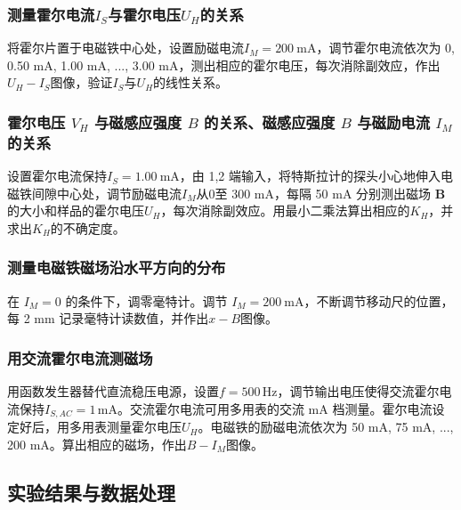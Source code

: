 \documentclass[UTF8]{article}
\theoremstyle{MyLineTheoremStyle} %
\theoremstyle{MyBlockTheoremStyle} %
\theoremstyle{MySubsubsectionStyle} %
\begin{document}
\subsubsection{测量霍尔电流$ I_S $与霍尔电压$ U_H $的关系}

将霍尔片置于电磁铁中心处，设置励磁电流$ I_M= 200 \ \mathrm{mA}$，调节霍尔电流依次为 0, 0.50 mA, 1.00 mA, ..., 3.00 mA，测出相应的霍尔电压，每次消除副效应，作出$ U_H-I_S $图像，验证$ I_S $与$ U_H $的线性关系。

\subsubsection{霍尔电压 $V_H$ 与磁感应强度 $B$ 的关系、磁感应强度 $B$ 与磁励电流 $I_M$ 的关系}

设置霍尔电流保持$ I_S = 1.00 \ \mathrm{mA}$，由 1,2 端输入，将特斯拉计的探头小心地伸入电磁铁间隙中心处，调节励磁电流$ I_M $从$ 0 $至 300 mA，每隔 50 mA 分别测出磁场 $\boldsymbol{B}$ 的大小和样品的霍尔电压$ U_H $，每次消除副效应。用最小二乘法算出相应的$ K_H $，并求出$ K_H $的不确定度。

\subsubsection{测量电磁铁磁场沿水平方向的分布}
在 $I_M = 0$ 的条件下，调零毫特计。调节 $I_M = 200 \ \mathrm{mA}$，不断调节移动尺的位置，每 2 mm 记录毫特计读数值，并作出$ x-B $图像。

\subsubsection{用交流霍尔电流测磁场}
用函数发生器替代直流稳压电源，设置$ f=500\,\mathrm{Hz} $，调节输出电压使得交流霍尔电流保持$ I_{S, AC}= 1\,\mathrm{mA} $。交流霍尔电流可用多用表的交流 mA 档测量。霍尔电流设定好后，用多用表测量霍尔电压$ U_H $。电磁铁的励磁电流依次为 50 mA, 75 mA, ..., 200 mA。算出相应的磁场，作出$ B-I_M $图像。

\subsection{实验结果与数据处理}
\end{document}
